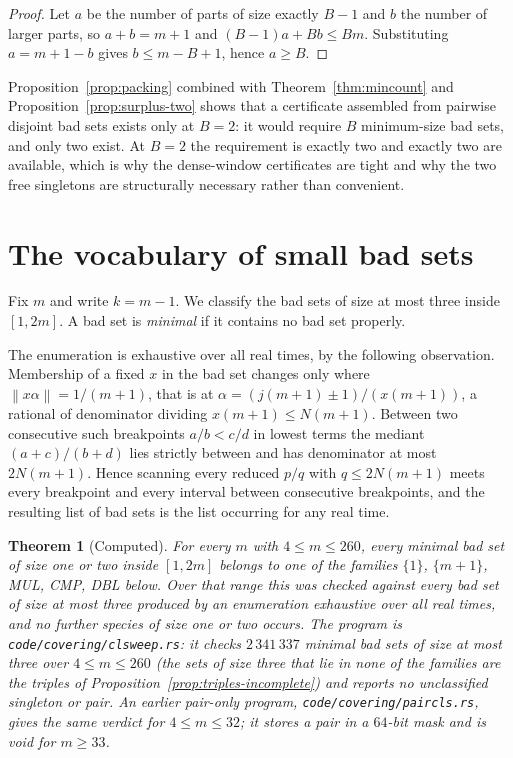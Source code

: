 \documentclass[11pt]{amsart}
\theoremstyle{plain}
\newtheorem{theorem}{Theorem}[section]
\theoremstyle{definition}
\newcommand{\Norm}[1]{\left\lVert #1 \right\rVert}
\begin{document}
\begin{proof}
Let $a$ be the number of parts of size exactly $B-1$ and $b$ the number of larger parts, so
$a + b = m+1$ and $(B-1)a + Bb \le Bm$. Substituting $a = m+1-b$ gives $b \le m-B+1$, hence
$a \ge B$.
\end{proof}

Proposition~\ref{prop:packing} combined with Theorem~\ref{thm:mincount} and
Proposition~\ref{prop:surplus-two} shows that a certificate assembled from pairwise disjoint bad
sets exists only at $B = 2$: it would require $B$ minimum-size bad sets, and only two exist. At
$B = 2$ the requirement is exactly two and exactly two are available, which is why the dense-window
certificates are tight and why the two free singletons are structurally necessary rather than
convenient.

\section{The vocabulary of small bad sets}\label{sec:vocab}

Fix $m$ and write $k = m-1$. We classify the bad sets of size at most three inside $[1,2m]$. A bad
set is \emph{minimal} if it contains no bad set properly.

The enumeration is exhaustive over all real times, by the following observation. Membership of a
fixed $x$ in the bad set changes only where $\Norm{x\alpha} = 1/(m+1)$, that is at
$\alpha = (j(m+1) \pm 1)/(x(m+1))$, a rational of denominator dividing $x(m+1) \le N(m+1)$. Between
two consecutive such breakpoints $a/b < c/d$ in lowest terms the mediant $(a+c)/(b+d)$ lies strictly
between and has denominator at most $2N(m+1)$. Hence scanning every reduced $p/q$ with
$q \le 2N(m+1)$ meets every breakpoint and every interval between consecutive breakpoints, and the
resulting list of bad sets is the list occurring for any real time.

\begin{theorem}[Computed]\label{thm:oth}
For every $m$ with $4 \le m \le 260$, every minimal bad set of size one or two inside $[1,2m]$
belongs to one of the families $\{1\}$, $\{m+1\}$, MUL, CMP, DBL below. Over that range this was
checked against every bad set of size at most three produced by an enumeration exhaustive over all
real times, and no further species of size one or two occurs. The program is \texttt{code/covering/clsweep.rs}: it checks $2\,341\,337$ minimal bad sets of size at most three over $4\le m\le260$ (the sets of size three that lie in none of the families are the triples of Proposition~\ref{prop:triples-incomplete}) and reports no unclassified singleton or pair. An earlier pair-only program, \texttt{code/covering/paircls.rs}, gives the same verdict for $4\le m\le32$; it stores a pair in a $64$-bit mask and is void for $m\ge33$.
\end{theorem}
\end{document}
